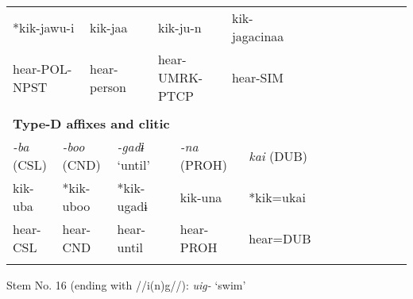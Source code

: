 \begin{tabularx}{\textwidth}{XXXXXXXXXXXXXXXXXXXXXXX}
\multicolumn{3}{X}{{ *kik-jawu-i}} & \multicolumn{4}{X}{kik-jaa} & \multicolumn{4}{X}{{ kik-ju-n}} & \multicolumn{4}{X}{{ kik-jagacinaa}} & \multicolumn{8}{X}{}\\
\multicolumn{3}{X}{hear-POL-NPST} & \multicolumn{4}{X}{hear-person} & \multicolumn{4}{X}{hear-UMRK-PTCP} & \multicolumn{4}{X}{hear-SIM} & \multicolumn{8}{X}{}\\
\multicolumn{23}{X}{}\\
\multicolumn{23}{X}{{\bfseries Type-D affixes and clitic}}\\
\multicolumn{2}{X}{{ \textit{{}-ba} (CSL)}} & \multicolumn{2}{X}{{ \textit{{}-boo} (CND)}} & \multicolumn{4}{X}{{ \textit{{}-gadɨ} ‘until’}} & \multicolumn{4}{X}{{ \textit{{}-na} (PROH)}} & \multicolumn{4}{X}{{ \textit{kai} (DUB)}} & \multicolumn{7}{X}{}\\
\multicolumn{2}{X}{{ kik-uba}} & \multicolumn{2}{X}{{ *kik-uboo}} & \multicolumn{4}{X}{{ *kik-ugadɨ}} & \multicolumn{4}{X}{{ kik-una}} & \multicolumn{4}{X}{{ *kik=ukai}} & \multicolumn{7}{X}{}\\
\multicolumn{2}{X}{hear-CSL} & \multicolumn{2}{X}{hear-CND} & \multicolumn{4}{X}{hear-until} & \multicolumn{4}{X}{hear-PROH} & \multicolumn{4}{X}{hear=DUB} & \multicolumn{7}{X}{}\\
\lspbottomrule
\end{tabularx}
Stem No. 16 (ending with //i(n)g//): \textit{uig-} ‘swim’

\tablefirsthead{}

